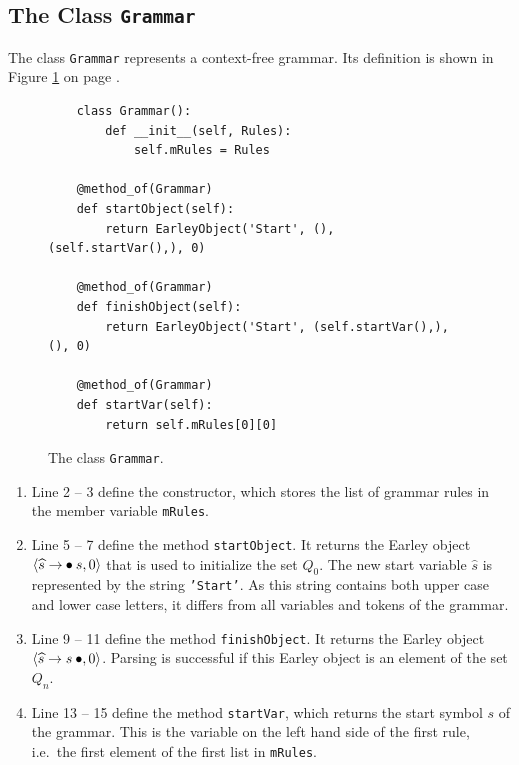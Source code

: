 \subsection{The Class \texttt{Grammar}}
The class \texttt{Grammar} represents a context-free grammar.  Its definition is shown in Figure
\ref{fig:01-Earley-Parser.ipynb:Grammar} on page \pageref{fig:01-Earley-Parser.ipynb:Grammar}.

\begin{figure}[!ht]
\centering
\begin{verbatim}
    class Grammar():
        def __init__(self, Rules):
            self.mRules = Rules

    @method_of(Grammar)
    def startObject(self):
        return EarleyObject('Start', (), (self.startVar(),), 0)

    @method_of(Grammar)
    def finishObject(self):
        return EarleyObject('Start', (self.startVar(),), (), 0)

    @method_of(Grammar)
    def startVar(self):
        return self.mRules[0][0]
\end{verbatim}
\vspace*{-0.3cm}
\caption{The class \texttt{Grammar}.}
\label{fig:01-Earley-Parser.ipynb:Grammar}
\end{figure}

\begin{enumerate}
\item Line 2 -- 3 define the constructor, which stores the list of grammar rules in the member variable
      \texttt{mRules}.
\item Line 5 -- 7 define the method \texttt{startObject}.  It returns the Earley object
      $\pair(\widehat{s} \rightarrow \mdot s, 0)$ that is used to initialize the set $Q_0$.
      The new start variable $\widehat{s}$ is represented by the string \texttt{'Start'}.  As this string contains
      both upper case and lower case letters, it differs from all variables and tokens of the grammar.
\item Line 9 -- 11 define the method \texttt{finishObject}.  It returns the Earley object
      $\pair(\widehat{s} \rightarrow s\mdot, 0)$.  Parsing is successful if this Earley object is an element of
      the set $Q_n$.
\item Line 13 -- 15 define the method \texttt{startVar}, which returns the start symbol $s$ of the grammar.  This
      is the variable on the left hand side of the first rule, i.e.~the first element of the first list in
      \texttt{mRules}.
\end{enumerate}

